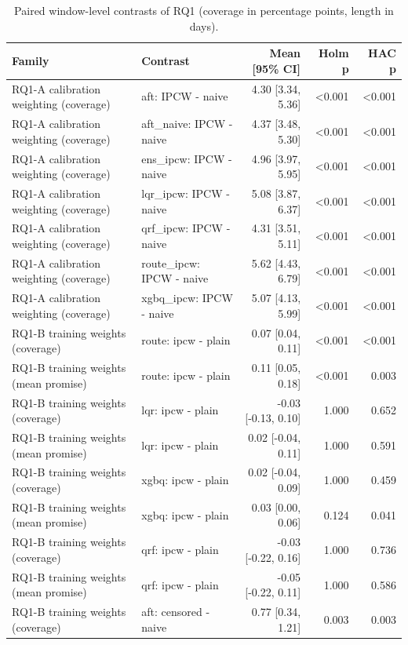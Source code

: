 \begin{table}[!htbp]
\centering
\footnotesize
\caption{Paired window-level contrasts of RQ1 (coverage in percentage points, length in days).}
\label{tab:rq1contrasts}
\begin{tabular}{llrrr}
\toprule
Family & Contrast & Mean [95\% CI] & Holm p & HAC p \\
\midrule
RQ1-A calibration weighting (coverage) & aft: IPCW - naive & 4.30 [3.34, 5.36] & <0.001 & <0.001 \\
RQ1-A calibration weighting (coverage) & aft\_naive: IPCW - naive & 4.37 [3.48, 5.30] & <0.001 & <0.001 \\
RQ1-A calibration weighting (coverage) & ens\_ipcw: IPCW - naive & 4.96 [3.97, 5.95] & <0.001 & <0.001 \\
RQ1-A calibration weighting (coverage) & lqr\_ipcw: IPCW - naive & 5.08 [3.87, 6.37] & <0.001 & <0.001 \\
RQ1-A calibration weighting (coverage) & qrf\_ipcw: IPCW - naive & 4.31 [3.51, 5.11] & <0.001 & <0.001 \\
RQ1-A calibration weighting (coverage) & route\_ipcw: IPCW - naive & 5.62 [4.43, 6.79] & <0.001 & <0.001 \\
RQ1-A calibration weighting (coverage) & xgbq\_ipcw: IPCW - naive & 5.07 [4.13, 5.99] & <0.001 & <0.001 \\
RQ1-B training weights (coverage) & route: ipcw - plain & 0.07 [0.04, 0.11] & <0.001 & <0.001 \\
RQ1-B training weights (mean promise) & route: ipcw - plain & 0.11 [0.05, 0.18] & <0.001 & 0.003 \\
RQ1-B training weights (coverage) & lqr: ipcw - plain & -0.03 [-0.13, 0.10] & 1.000 & 0.652 \\
RQ1-B training weights (mean promise) & lqr: ipcw - plain & 0.02 [-0.04, 0.11] & 1.000 & 0.591 \\
RQ1-B training weights (coverage) & xgbq: ipcw - plain & 0.02 [-0.04, 0.09] & 1.000 & 0.459 \\
RQ1-B training weights (mean promise) & xgbq: ipcw - plain & 0.03 [0.00, 0.06] & 0.124 & 0.041 \\
RQ1-B training weights (coverage) & qrf: ipcw - plain & -0.03 [-0.22, 0.16] & 1.000 & 0.736 \\
RQ1-B training weights (mean promise) & qrf: ipcw - plain & -0.05 [-0.22, 0.11] & 1.000 & 0.586 \\
RQ1-B training weights (coverage) & aft: censored - naive & 0.77 [0.34, 1.21] & 0.003 & 0.003 \\

\end{tabular}
\end{table}
